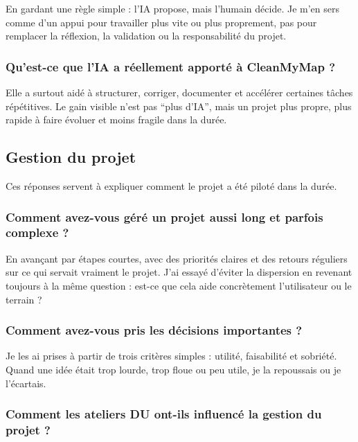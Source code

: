 \documentclass[
  10pt,
  a4paper,
  DIV=11,
  numbers=noendperiod,
  oneside]{scrreprt}
\begin{document}
En gardant une règle simple : l'IA propose, mais l'humain décide. Je
m'en sers comme d'un appui pour travailler plus vite ou plus proprement,
pas pour remplacer la réflexion, la validation ou la responsabilité du
projet.

\subsubsection{Qu'est-ce que l'IA a réellement apporté à CleanMyMap
?}\label{quest-ce-que-lia-a-ruxe9ellement-apportuxe9-uxe0-cleanmymap}

Elle a surtout aidé à structurer, corriger, documenter et accélérer
certaines tâches répétitives. Le gain visible n'est pas ``plus d'IA'',
mais un projet plus propre, plus rapide à faire évoluer et moins fragile
dans la durée.

\subsection{Gestion du projet}\label{gestion-du-projet}

Ces réponses servent à expliquer comment le projet a été piloté dans la
durée.

\subsubsection{Comment avez-vous géré un projet aussi long et parfois
complexe
?}\label{comment-avez-vous-guxe9ruxe9-un-projet-aussi-long-et-parfois-complexe}

En avançant par étapes courtes, avec des priorités claires et des
retours réguliers sur ce qui servait vraiment le projet. J'ai essayé
d'éviter la dispersion en revenant toujours à la même question : est-ce
que cela aide concrètement l'utilisateur ou le terrain ?

\subsubsection{Comment avez-vous pris les décisions importantes
?}\label{comment-avez-vous-pris-les-duxe9cisions-importantes}

Je les ai prises à partir de trois critères simples : utilité,
faisabilité et sobriété. Quand une idée était trop lourde, trop floue ou
peu utile, je la repoussais ou je l'écartais.

\subsubsection{Comment les ateliers DU ont-ils influencé la gestion du
projet
?}\label{comment-les-ateliers-du-ont-ils-influencuxe9-la-gestion-du-projet}
\end{document}

